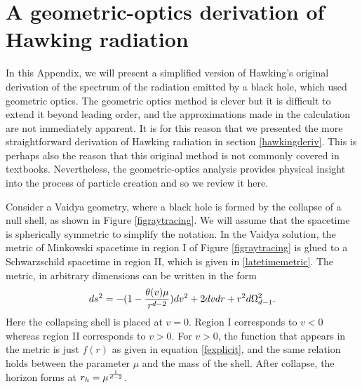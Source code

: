 \documentclass[12pt]{article}
\newcommand{\be}{\begin{equation}}
\newcommand{\ee}{\end{equation}}
\begin{document}
\appendix
\section{A geometric-optics derivation of Hawking radiation \label{secraytracehawk}}
In this Appendix, we will present a simplified version of  Hawking's original derivation \cite{Hawking:1974sw} of the spectrum of the radiation emitted by a black hole, which used geometric optics. The geometric optics method is clever but it is difficult to  extend it beyond leading
order, and the approximations made in the calculation are not immediately apparent. It is for this reason that we presented the more straightforward derivation of Hawking radiation in section \ref{hawkingderiv}. This is perhaps
also the reason that this original method is not commonly covered in textbooks. Nevertheless, the geometric-optics analysis provides physical insight into the process of particle creation and so we review it here.


Consider a Vaidya geometry, where a black hole is formed by the  collapse of a null shell, as shown in Figure \ref{figraytracing}. We will assume that the spacetime is spherically symmetric to simplify the notation. In the Vaidya
solution, the metric of Minkowski spacetime in region I of Figure \ref{figraytracing} is glued to a Schwarzschild spacetime in region II, which is given in \eqref{latetimemetric}. The metric, in arbitrary dimensions can be written in the form \cite{Iyer:1989nd}
\be
ds^2 = -(1 - {\theta(v) \mu \over r^{d-2}}) d v^2 + 2 d v d r + r^2 d \Omega_{d-1}^2.
\ee
Here the collapsing shell is placed at $v = 0$.  Region I corresponds to $v < 0$ whereas region II corresponds to $v > 0$. For $v > 0$, the function that appears in the metric is just $f(r)$ as given in equation \eqref{fexplicit}, and the same relation holds between the parameter $\mu$ and the mass of the shell. After collapse, the horizon forms at $r_h = \mu^{1 \over d-2}$.
\end{document}
